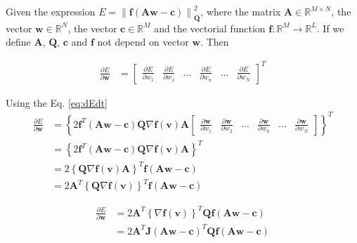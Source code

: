 Given the expression $E=\left\|\mathbf{f}\left(\mathbf{A}\mathbf{w}-\mathbf{c}\right)\right\|_{\mathbf{Q}}^2$,
where
the matrix $\mathbf{A} \in \mathbb{R}^{M\times N}$,
the vector $\mathbf{w} \in \mathbb{R}^{N}$,
the vector $\mathbf{c} \in \mathbb{R}^{M}$ and 
the vectorial function $\mathbf{f}:\mathbb{R}^{M} \to \mathbb{R}^{L}$.
If we define $\mathbf{A}$, $\mathbf{Q}$, $\mathbf{c}$ and $\mathbf{f}$ not depend on vector $\mathbf{w}$. 
Then 

\begin{align}
\frac{\partial E}{\partial \mathbf{w}}
&=
\begin{bmatrix}
\frac{\partial E}{\partial w_{1}}&
\frac{\partial E}{\partial w_{1}}&
\dots&
\frac{\partial E}{\partial w_{n}}&
\dots&
\frac{\partial E}{\partial w_{N}}
\end{bmatrix}^{T}
\end{align}

Using the Eq. \ref{eq:dEdt}
\begin{align}
\frac{\partial E}{\partial \mathbf{w}}
&=
\left\{
2
\mathbf{f}^{T}\left(\mathbf{A}\mathbf{w}-\mathbf{c}\right)\mathbf{Q}
\nabla \mathbf{f}(\mathbf{v})
\mathbf{A}
\begin{bmatrix}
\frac{\partial \mathbf{w}}{\partial w_{1}}&
\frac{\partial \mathbf{w}}{\partial w_{2}}&
\dots&
\frac{\partial \mathbf{w}}{\partial w_{n}}&
\dots&
\frac{\partial \mathbf{w}}{\partial w_{N}}
\end{bmatrix}
\right\}^{T}\\[4pt]
&=
\left\{
2
\mathbf{f}^{T}\left(\mathbf{A}\mathbf{w}-\mathbf{c}\right)\mathbf{Q}
\nabla \mathbf{f}(\mathbf{v})
\mathbf{A}
\right\}^{T}\\[4pt]
&=
2
\left\{
\mathbf{Q}
\nabla \mathbf{f}(\mathbf{v})
\mathbf{A}
\right\}^{T}
\mathbf{f}\left(\mathbf{A}\mathbf{w}-\mathbf{c}\right)\\[4pt]
&=
2
\mathbf{A}^{T}
\left\{
\mathbf{Q}
\nabla \mathbf{f}(\mathbf{v})
\right\}^{T}
\mathbf{f}\left(\mathbf{A}\mathbf{w}-\mathbf{c}\right)
\end{align}

\begin{align}
\frac{\partial E}{\partial \mathbf{w}}
&=
2
\mathbf{A}^{T}
\left\{
\nabla \mathbf{f}(\mathbf{v})
\right\}^{T}
\mathbf{Q}
\mathbf{f}\left(\mathbf{A}\mathbf{w}-\mathbf{c}\right)\\
&=
2
\mathbf{A}^{T}
\mathbf{J}\left(\mathbf{A}\mathbf{w}-\mathbf{c}\right)^{T}
\mathbf{Q}
\mathbf{f}\left(\mathbf{A}\mathbf{w}-\mathbf{c}\right)
\end{align}

